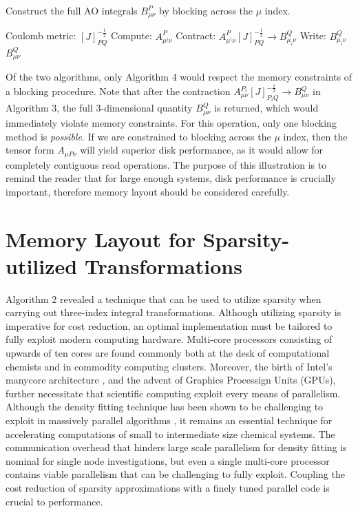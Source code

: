 \begin{algorithm}[H]
\caption{Construct the full AO integrals $B_{\mu \nu}^P$ by blocking across the $\mu$ index.}
\begin{algorithmic}
\REQUIRE Coulomb metric: $[J]_{PQ}^{-\frac{1}{2}}$
    \STATE Compute:  $A_{\mu^i \nu}^{P}$
    \STATE Contract: $A_{\mu^i \nu}^{P}[J]_{PQ}^{-\frac{1}{2}} \rightarrow B_{\mu_i \nu}^Q$
    \STATE Write:    $B_{\mu_i \nu}^Q$
\ENDFOR
\RETURN $B_{\mu \nu}^Q$
\end{algorithmic}
\end{algorithm}

Of the two algorithms, only Algorithm 4 would respect the memory constraints of a blocking procedure. Note that after the 
contraction $A_{\mu \nu}^{P_i} [J]_{P_iQ}^{-\frac{1}{2}} \rightarrow B_{\mu \nu}^Q$ in Algorithm 3, the full 3-dimensional quantity
$B_{\mu \nu}^Q$ is returned, which would immediately violate memory constraints. For this operation, only one blocking method is
\textit{possible}. If we are constrained to blocking across the $\mu$ index, then the tensor form $A_{\mu P \nu}$ will yield
superior disk performance, as it would allow for completely contiguous read operations. The purpose of this illustration is
to remind the reader that for large enough systems, disk performance
is crucially important, therefore memory layout should be considered carefully.

\section{Memory Layout for Sparsity-utilized Transformations}

Algorithm 2 revealed a technique that can be used to utilize sparsity when carrying out three-index integral transformations.
Although utilizing sparsity is imperative for cost reduction, an optimal implementation must be tailored to
fully exploit modern computing hardware.
Multi-core processors consisting of upwards of ten cores are found commonly both at the desk of computational
chemists and in commodity computing clusters.
Moreover, the birth of Intel's manycore architecture , and the advent of Graphics Processign Units (GPUs), 
further necessitate that scientific computing
exploit every means of parallelism.
Although the density fitting technique has been shown to be challenging to exploit in massively parallel
algorithms \cite{ref3}, it remains an essential technique for accelerating computations of 
small to intermediate size chemical systems.
The communication overhead that hinders large scale parallelism for density
fitting is nominal for single node investigations, but even a single multi-core processor contains viable
parallelism that can be challenging to fully exploit. 
Coupling the cost reduction of sparsity approximations with a finely tuned parallel code is crucial to performance.  

